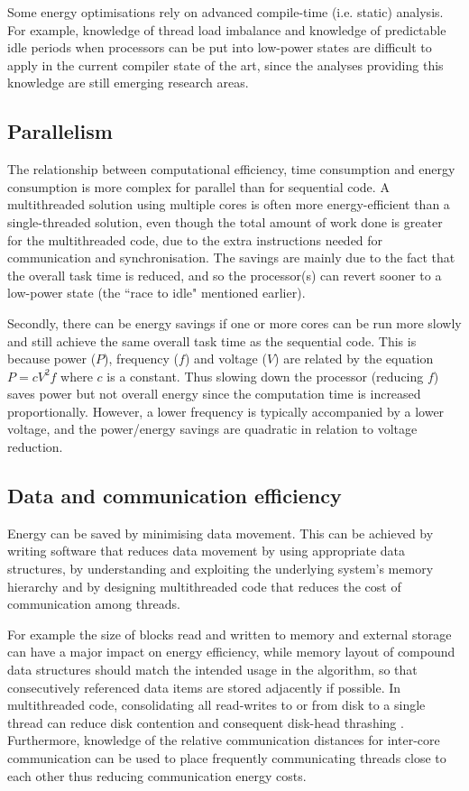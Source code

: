 \documentclass[oneside]{book}
\begin{document}
Some energy optimisations rely on advanced compile-time (i.e. static) analysis. For example, knowledge of thread load imbalance and knowledge of predictable idle periods when processors can be put into low-power states are difficult to apply in the current compiler state of the art, since the analyses providing this knowledge are still emerging research areas.


\subsection{Parallelism}

The relationship between computational efficiency, time consumption and energy consumption is more complex for parallel than for sequential code.  A multithreaded solution using multiple cores is often more energy-efficient than a single-threaded solution, even though the total amount of work done is greater for the multithreaded code, due to the extra instructions needed for communication and synchronisation. The savings are mainly due to the fact that the overall task time is reduced, and so the processor(s) can revert sooner to a low-power state (the ``race to idle" mentioned earlier).  

Secondly, there can be energy savings if one or more cores can be run more slowly and still achieve the same overall task time as the sequential code.  This is because power ($P$), frequency ($f$) and voltage ($V$) are related by the equation $P = c V^2 f$ where $c$ is a constant. Thus slowing down the processor (reducing $f$) saves power but not overall energy since the computation time is increased proportionally. However, a lower frequency is typically accompanied by a lower voltage, and the power/energy savings are quadratic in relation to voltage reduction.

\subsection{Data and communication efficiency}

Energy can be saved by minimising data movement. This can be achieved by writing software that reduces data movement by using appropriate data structures, by understanding and exploiting the underlying system's memory hierarchy and by designing multithreaded code that reduces the cost of communication among threads.  

For example the size of blocks read and written to memory and external storage can have a major impact on energy efficiency, while memory layout of compound data structures should match the intended usage in the algorithm, so that consecutively referenced data items are stored adjacently if possible.  In multithreaded code, consolidating all read-writes to or from disk to a single thread can reduce disk contention and consequent disk-head thrashing \cite{Steigerwald_Agrawal_2011}.  Furthermore, knowledge of the relative communication distances for inter-core communication can be used to place frequently communicating threads close to each other \cite{KerrisonSwallow15} thus reducing communication energy costs.
\end{document}
